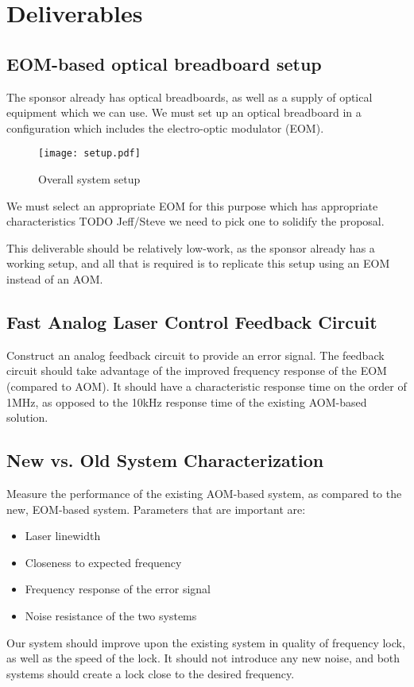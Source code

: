 \newpage
\section{Deliverables}

\subsection{EOM-based optical breadboard setup}

The sponsor already has optical breadboards, as well as a supply of optical equipment which we can use.  We must set up an optical breadboard in a configuration which includes the electro-optic modulator (EOM).

\begin{figure}
  \centering
  \label{setup}
  \texttt{[image: setup.pdf]}
  \caption{Overall system setup}
\end{figure}

We must select an appropriate EOM for this purpose which has appropriate characteristics TODO Jeff/Steve we need to pick one to solidify the proposal.

This deliverable should be relatively low-work, as the sponsor already has a working setup, and all that is required is to replicate this setup using an EOM instead of an AOM.

\subsection{Fast Analog Laser Control Feedback Circuit}

Construct an analog feedback circuit to provide an error signal.  The feedback circuit should take advantage of the improved frequency response of the EOM (compared to AOM).  It should have a characteristic response time on the order of 1MHz, as opposed to the 10kHz response time of the existing AOM-based solution.

\subsection{New vs. Old System Characterization}

Measure the performance of the existing AOM-based system, as compared to the new, EOM-based system.  Parameters that are important are:

\begin{itemize}
    \item Laser linewidth
    \item Closeness to expected frequency
    \item Frequency response of the error signal
    \item Noise resistance of the two systems
\end{itemize}

Our system should improve upon the existing system in quality of frequency lock, as well as the speed of the lock.  It should not introduce any new noise, and both systems should create a lock close to the desired frequency.
